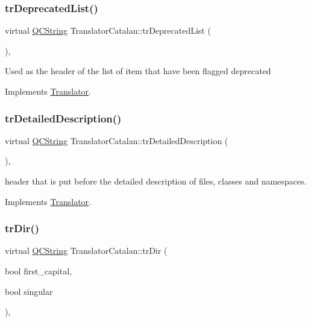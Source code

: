 \subsubsection{\texorpdfstring{trDeprecatedList()}{trDeprecatedList()}}
{\footnotesize\ttfamily virtual \mbox{\hyperlink{class_q_c_string}{Q\+C\+String}} Translator\+Catalan\+::tr\+Deprecated\+List (\begin{DoxyParamCaption}{ }\end{DoxyParamCaption})\hspace{0.3cm}{\ttfamily [inline]}, {\ttfamily [virtual]}}

Used as the header of the list of item that have been flagged deprecated 

Implements \mbox{\hyperlink{class_translator}{Translator}}.

\mbox{\label{class_translator_catalan_aff391bcef4e62c6ded50a377fdebe737}} 
\subsubsection{\texorpdfstring{trDetailedDescription()}{trDetailedDescription()}}
{\footnotesize\ttfamily virtual \mbox{\hyperlink{class_q_c_string}{Q\+C\+String}} Translator\+Catalan\+::tr\+Detailed\+Description (\begin{DoxyParamCaption}{ }\end{DoxyParamCaption})\hspace{0.3cm}{\ttfamily [inline]}, {\ttfamily [virtual]}}

header that is put before the detailed description of files, classes and namespaces. 

Implements \mbox{\hyperlink{class_translator}{Translator}}.

\mbox{\label{class_translator_catalan_a5cf461ccdb77b01c2a774152595d5210}} 
\subsubsection{\texorpdfstring{trDir()}{trDir()}}
{\footnotesize\ttfamily virtual \mbox{\hyperlink{class_q_c_string}{Q\+C\+String}} Translator\+Catalan\+::tr\+Dir (\begin{DoxyParamCaption}\item[{bool}]{first\+\_\+capital,  }\item[{bool}]{singular }\end{DoxyParamCaption})\hspace{0.3cm}{\ttfamily [inline]}, {\ttfamily [virtual]}}

